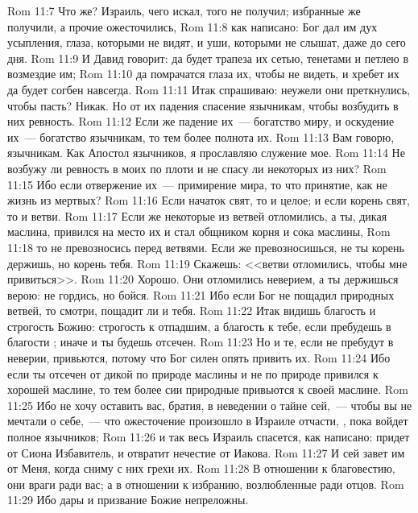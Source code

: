 \vs Rom 11:7 Что же? Израиль, чего искал, того не получил; избранные же получили, а прочие ожесточились,
\vs Rom 11:8 как написано: Бог дал им дух усыпления, глаза, которыми не видят, и уши, которыми не слышат, даже до сего дня.
\vs Rom 11:9 И Давид говорит: да будет трапеза их сетью, тенетами и петлею в возмездие им;
\vs Rom 11:10 да помрачатся глаза их, чтобы не видеть, и хребет их да будет согбен навсегда.
\rsbpar\vs Rom 11:11 Итак спрашиваю: неужели они преткнулись, чтобы  пасть? Никак. Но от их падения спасение язычникам, чтобы возбудить в них ревность.
\vs Rom 11:12 Если же падение их~--- богатство миру, и оскудение их~--- богатство язычникам, то тем более полнота их.
\rsbpar\vs Rom 11:13 Вам говорю, язычникам. Как Апостол язычников, я прославляю служение мое.
\vs Rom 11:14 Не возбужу ли ревность в  моих по плоти и не спасу ли некоторых из них?
\vs Rom 11:15 Ибо если отвержение их~--- примирение мира, то что  принятие, как не жизнь из мертвых?
\vs Rom 11:16 Если начаток свят, то и целое; и если корень свят, то и ветви.
\vs Rom 11:17 Если же некоторые из ветвей отломились, а ты, дикая маслина, привился на место их и стал общником корня и сока маслины,
\vs Rom 11:18 то не превозносись перед ветвями. Если же превозносишься,  не ты корень держишь, но корень тебя.
\vs Rom 11:19 Скажешь: <<ветви отломились, чтобы мне привиться>>.
\vs Rom 11:20 Хорошо. Они отломились неверием, а ты держишься верою: не гордись, но бойся.
\vs Rom 11:21 Ибо если Бог не пощадил природных ветвей, то смотри, пощадит ли и тебя.
\vs Rom 11:22 Итак видишь благость и строгость Божию: строгость к отпадшим, а благость к тебе, если пребудешь в благости ; иначе и ты будешь отсечен.
\vs Rom 11:23 Но и те, если не пребудут в неверии, привьются, потому что Бог силен опять привить их.
\vs Rom 11:24 Ибо если ты отсечен от дикой по природе маслины и не по природе привился к хорошей маслине, то тем более сии природные привьются к своей маслине.
\rsbpar\vs Rom 11:25 Ибо не хочу оставить вас, братия, в неведении о тайне сей,~--- чтобы вы не мечтали о себе,~--- что ожесточение произошло в Израиле отчасти, , пока войдет полное  язычников;
\vs Rom 11:26 и так весь Израиль спасется, как написано: придет от Сиона Избавитель, и отвратит нечестие от Иакова.
\vs Rom 11:27 И сей завет им от Меня, когда сниму с них грехи их.
\vs Rom 11:28 В отношении к благовестию, они враги ради вас; а в отношении к избранию, возлюбленные  ради отцов.
\vs Rom 11:29 Ибо дары и призвание Божие непреложны.
